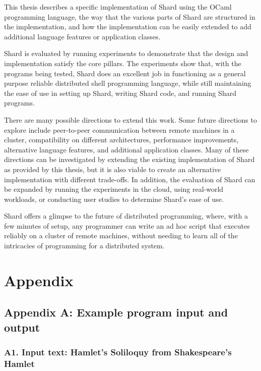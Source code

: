 \documentclass[oneside]{report}
\newcommand{\todoi}[1]{\todo[inline, color=blue!20]{TODO: {#1}}}
\begin{document}
This thesis describes a specific implementation of Shard using the OCaml programming language, the way that the various parts of Shard are structured in the implementation, and how the implementation can be easily extended to add additional language features or application classes.

Shard is evaluated by running experiments to demonstrate that the design and implementation satisfy the core pillars. The experiments show that, with the programs being tested, Shard does an excellent job in functioning as a general purpose reliable distributed shell programming language, while still maintaining the ease of use in setting up Shard, writing Shard code, and running Shard programs.

There are many possible directions to extend this work.
Some future directions to explore include peer-to-peer communication between remote machines in a cluster, compatibility on different architectures, performance improvements, alternative language features, and additional application classes.
Many of these directions can be investigated by extending the existing implementation of Shard as provided by this thesis, but it is also viable to create an alternative implementation with different trade-offs.
In addition, the evaluation of Shard can be expanded by running the experiments in the cloud, using real-world workloads, or conducting user studies to determine Shard's ease of use.


Shard offers a glimpse to the future of distributed programming, where, with a few minutes of setup, any programmer can write an ad hoc script that executes reliably on a cluster of remote machines, without needing to learn all of the intricacies of programming for a distributed system.


\chapter{Appendix}
\section{Appendix A: Example program input and output}

\subsection{A1. Input text: Hamlet's Soliloquy from Shakespeare's Hamlet}
\end{document}
